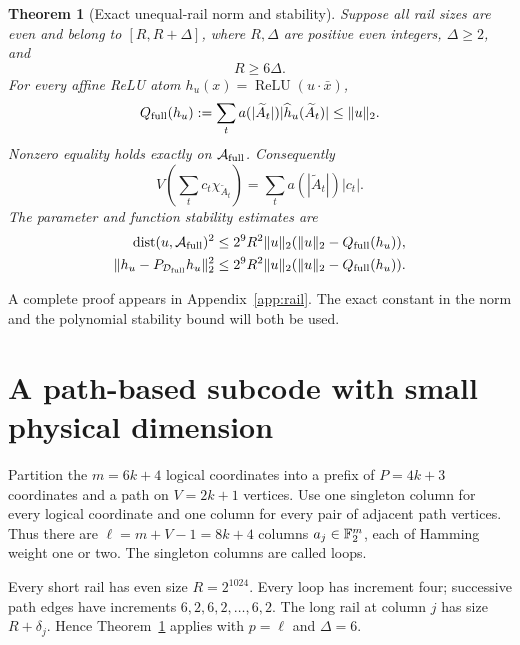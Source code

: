 \documentclass[11pt]{article}
\newtheorem{theorem}{Theorem}
\theoremstyle{remark}\newtheorem{remark}[theorem]{Remark}
\newcommand{\relu}{\operatorname{ReLU}}\newcommand{\Var}{\operatorname{Var}}
\begin{document}
\begin{theorem}[Exact unequal-rail norm and stability]\label{thm:rail}
Suppose all rail sizes are even and belong to $[R,R+\Delta]$, where
$R,\Delta$ are positive even integers, $\Delta\ge2$, and
\begin{equation}\label{eq:large-R}
 R\ge6\Delta.
\end{equation}
For every affine ReLU atom $h_u(x)=\relu(u\cdot\bar x)$,
\begin{equation}\label{eq:atom-norm}
 Q_{\rm full}(h_u):=\sum_ta(|\widetilde A_t|)
          |\widehat h_u(\widetilde A_t)|\le\|u\|_2.
\end{equation}
Nonzero equality holds exactly on $\mathcal A_{\rm full}$.
Consequently
\begin{equation}\label{eq:exact-code-norm}
 V\left(\sum_tc_t\chi_{\widetilde A_t}\right)
 =\sum_ta(|\widetilde A_t|)|c_t|.
\end{equation}
The parameter and function stability estimates are
\begin{align}
 \operatorname{dist}(u,\mathcal A_{\rm full})^2
 &\le2^9R^2\|u\|_2(\|u\|_2-Q_{\rm full}(h_u)),
 \label{eq:parameter-stability}\\
 \|h_u-P_{\mathcal D_{\rm full}}h_u\|_2^2
 &\le2^9R^2\|u\|_2(\|u\|_2-Q_{\rm full}(h_u)).
 \label{eq:atom-stability}
\end{align}
\end{theorem}

A complete proof appears in Appendix~\ref{app:rail}. The exact constant
in the norm and the polynomial stability bound will both be used.

\section{A path-based subcode with small physical dimension}
\label{sec:path-code}

Partition the $m=6k+4$ logical coordinates into a prefix of
$P=4k+3$ coordinates and a path on $V=2k+1$ vertices. Use one
singleton column for every logical coordinate and one column for every
pair of adjacent path vertices. Thus there are
$\ell=m+V-1=8k+4$ columns $a_j\in\mathbb F_2^m$, each of Hamming weight
one or two. The singleton columns are called loops.

Every short rail has even size $R=2^{1024}$. Every loop has increment
four; successive path edges have increments $6,2,6,2,\ldots,6,2$.
The long rail at column $j$ has size $R+\delta_j$. Hence
Theorem~\ref{thm:rail} applies with $p=\ell$ and $\Delta=6$.
\end{document}
